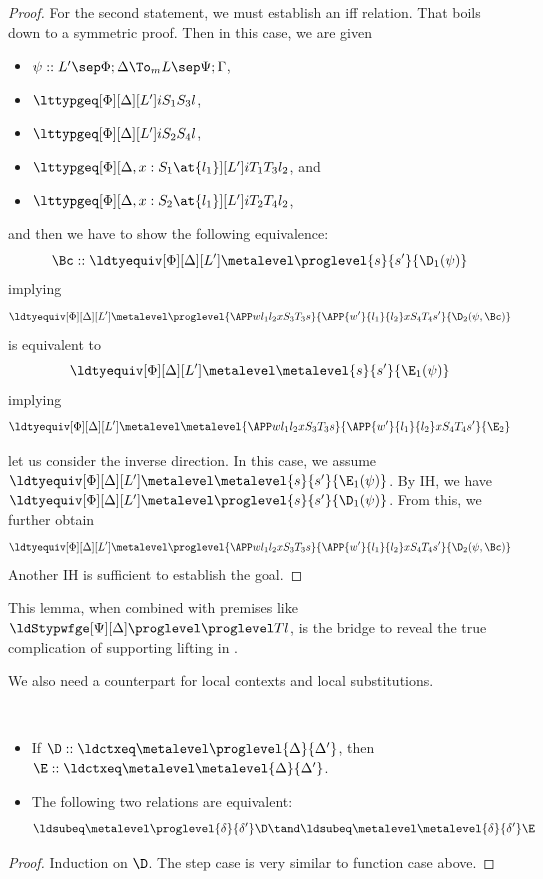 \begin{proof}
  For the second statement, we must establish an iff relation. %
  That boils down to a symmetric proof. %
  Then in this case, we are given
  \begin{itemize}
  \item $\psi :: L' \sep \Phi;\Delta \To_m L \sep \Psi; \Gamma$,    
  \item $\lttypgeq[\Phi][\Delta][L'] i{S_1}{S_3}l$,
  \item $\lttypgeq[\Phi][\Delta][L'] i{S_2}{S_4}l$, 
  \item $\lttypgeq[\Phi][\Delta, x : S_1 \at{l_1}][L'] i{T_1}{T_3}{l_2}$, and
  \item $\lttypgeq[\Phi][\Delta, x : S_2 \at{l_1}][L'] i{T_2}{T_4}{l_2}$,
  \end{itemize}
  and then we have to show the following equivalence:
  \[
    \Bc :: \ldtyequiv[\Phi][\Delta][L'] \metalevel \proglevel {s}{s'}{\D_1(\psi)}
  \]
  implying
  \[
    \ldtyequiv[\Phi][\Delta][L'] \metalevel \proglevel{\APP w{l_1}{l_2} x{S_3}{T_3} s}{\APP{w'}{l_1}{l_2}
      x{S_4}{T_4}{s'}}{\D_2(\psi, \Bc)}
  \]
  is equivalent to
  \[
    \ldtyequiv[\Phi][\Delta][L'] \metalevel \metalevel {s}{s'}{\E_1(\psi)}
  \]
  implying
  \[
    \ldtyequiv[\Phi][\Delta][L'] \metalevel \metalevel{\APP w{l_1}{l_2} x{S_3}{T_3} s}{\APP{w'}{l_1}{l_2}
      x{S_4}{T_4}{s'}}{\E_2}
  \]

  let us consider the inverse direction. %
  In this case, we assume $\ldtyequiv[\Phi][\Delta][L'] \metalevel \metalevel {s}{s'}{\E_1(\psi)}$. %
  By IH, we have $\ldtyequiv[\Phi][\Delta][L'] \metalevel \proglevel {s}{s'}{\D_1(\psi)}$. %
  From this, we further obtain
  \[
    \ldtyequiv[\Phi][\Delta][L'] \metalevel \proglevel{\APP w{l_1}{l_2} x{S_3}{T_3} s}{\APP{w'}{l_1}{l_2}
      x{S_4}{T_4}{s'}}{\D_2(\psi, \Bc)}
  \] %
  Another IH is sufficient to establish the goal. 
\end{proof}
This lemma, when combined with premises like $\ldStypwfge[\Psi][\Delta] \proglevel \proglevel T l$, is
the bridge to reveal the true complication of supporting lifting in \delamlang. %

We also need a counterpart for local contexts and local substitutions.
\begin{lemma} $ $
  \begin{itemize}
  \item If $\D :: \ldctxeq \metalevel \proglevel{\Delta}{\Delta'}$, then $\E :: \ldctxeq \metalevel \metalevel{\Delta}{\Delta'}$.
  \item The following two relations are equivalent:
    \[
      \ldsubeq \metalevel \proglevel{\delta}{\delta'}\D \tand \ldsubeq \metalevel \metalevel {\delta}{\delta'}\E
    \]
  \end{itemize}
\end{lemma}
\begin{proof}
  Induction on $\D$. %
  The step case is very similar to function case above. %
\end{proof}